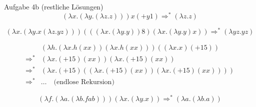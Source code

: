 \documentclass[t]{beamer}
\begin{document}
\begin{frame}{Aufgabe 4b (restliche Lösungen)}
  \begin{equation*}
    (λx.(λ y.(λz.z))) x (+ y 1) \Rightarrow^{*} (λz.z)
  \end{equation*}

  \begin{equation*}
    (λx.(λ y.x (λz. y z))) (((λx.(λ y. y)) 8) (λx.(λ y. y) x)) \Rightarrow^{*} (λ y z. y z)
  \end{equation*}

  \begin{align*}
          & (λh.(λx.h (x x)) (λx.h (x x))) ((λx.x) (+ 1 5)) \\
    {}\Rightarrow^{*}{} & (λx. (+ 1 5) (x x)) (λx. (+ 1 5) (x x)) \\
    {}\Rightarrow^{*}{} & (λx. (+ 1 5) ((λx. (+ 1 5) (x x)) (λx. (+ 1 5) (x x)))) \\
    {}\Rightarrow^{*}{} & … \quad \text{(endlose Rekursion)}
  \end{align*}

  \begin{equation*}
    (λ f .(λa.(λb. f a b))) (λx.(λ y.x)) \Rightarrow^{*} (λa.(λb.a))
  \end{equation*}
\end{frame}
\end{document}

